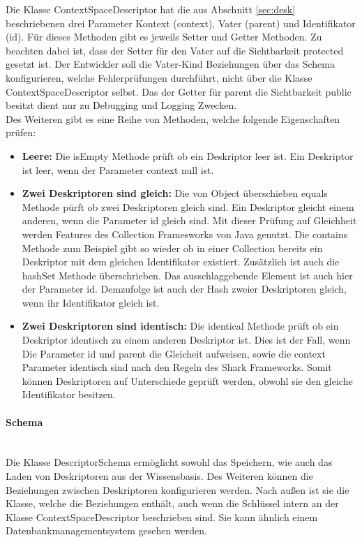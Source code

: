 \documentclass[a4paper]{article}
\begin{document}
	Die Klasse ContextSpaceDescriptor hat die aus Abschnitt \ref{sec:desk} 
	beschriebenen drei Parameter Kontext (context), Vater (parent) und
	Identifikator (id). Für dieses Methoden gibt es jeweils Setter und Getter
	Methoden. Zu beachten dabei ist, dass der Setter für den Vater auf die
	Sichtbarkeit protected gesetzt ist. Der Entwickler soll die	Vater-Kind
	Beziehungen über das Schema konfigurieren, welche Fehlerprüfungen durchführt,
	nicht über die Klasse ContextSpaceDescriptor selbst. Das der Getter für
	parent die Sichtbarkeit public besitzt dient nur zu Debugging und Logging
	Zwecken.\\
	
	Des Weiteren gibt es eine Reihe von Methoden, welche folgende Eigenschaften
	prüfen:
	
	\begin{itemize}
		\item \textbf{Leere:} Die isEmpty Methode prüft ob ein Deskriptor
		leer ist. Ein Deskriptor ist leer, wenn der Parameter context null ist.
		\item \textbf{Zwei Deskriptoren sind gleich:} Die von Object überschieben
		equals Methode pürft ob zwei Deskriptoren gleich sind. Ein Deskriptor
		gleicht einem anderen, wenn die Parameter id gleich sind. Mit dieser
		Prüfung	auf Gleichheit werden Features des Collection Framesworks 
		von Java genutzt. Die contains Methode zum Beispiel gibt so wieder ob
		in einer Collection bereits ein Deskriptor mit dem gleichen Identifikator
		existiert. Zusätzlich ist auch die hashSet Methode überschrieben. Das
		ausschlaggebende Element ist auch hier der Parameter id. Demzufolge
		ist auch der Hash zweier Deskriptoren gleich, wenn ihr Identifikator 
		gleich ist.
		\item \textbf{Zwei Deskriptoren sind identisch:} Die identical Methode
		prüft ob ein Deskriptor identisch zu einem anderen Deskriptor ist. Dies
		ist der Fall, wenn Die Parameter id und parent die Gleicheit aufweisen,
		sowie die context Parameter identisch sind nach den Regeln des Shark
		Frameworks. Somit können Deskriptoren auf Unterschiede geprüft werden,
		obwohl sie den gleiche Identifikator besitzen.
	\end{itemize}
	
	\paragraph{Schema}\mbox{} \\
	
	Die Klasse DescriptorSchema ermöglicht sowohl das Speichern, wie auch das
	Laden von Deskriptoren aus der Wissensbasis. Des Weiteren können die
	Beziehungen	zwischen Deskriptoren konfigurieren werden.
	Nach außen ist sie die Klasse, welche die Beziehungen enthält, auch wenn die
	Schlüssel intern an der Klasse ContextSpaceDescriptor beschrieben sind. Sie kann
	ähnlich einem Datenbankmanagementsystem gesehen werden. \\
	
\end{document}
